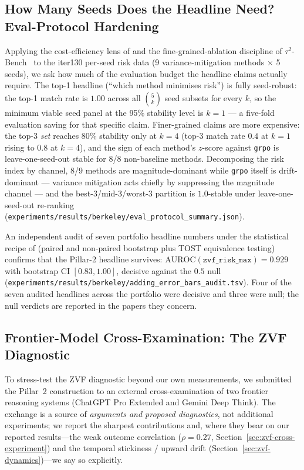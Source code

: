 \documentclass{article}
\begin{document}
 \subsection{How Many Seeds Does the Headline Need? Eval-Protocol Hardening}
\label{sec:zvf-eval-protocol}

Applying the cost-efficiency lens of \citet{yehudai2025survey} and the
fine-grained-ablation discipline of $\tau^2$-Bench~\citep{barres2025tau2}
to the iter130 per-seed risk data (9 variance-mitigation methods
$\times$ 5 seeds), we ask how much of the evaluation budget the headline
claims actually require. The top-1 headline (``which method minimises
risk'') is fully seed-robust: the top-1 match rate is $1.00$ across all
$\binom{5}{k}$ seed subsets for every $k$, so the minimum viable seed
panel at the 95\% stability level is $k{=}1$ --- a five-fold evaluation
saving for that specific claim. Finer-grained claims are more expensive:
the top-3 \emph{set} reaches 80\% stability only at $k{=}4$ (top-3 match
rate $0.4$ at $k{=}1$ rising to $0.8$ at $k{=}4$), and the sign of each
method's $z$-score against \texttt{grpo} is leave-one-seed-out stable
for 8/8 non-baseline methods. Decomposing the risk index by channel,
8/9 methods are magnitude-dominant while \texttt{grpo} itself is
drift-dominant --- variance mitigation acts chiefly by suppressing the
magnitude channel --- and the best-3/mid-3/worst-3 partition is
$1.0$-stable under leave-one-seed-out re-ranking
(\texttt{experiments/results/berkeley/eval\_protocol\_summary.json}).

An independent audit of seven portfolio headline numbers under the
statistical recipe of \citet{miller2024errorbars} (paired and non-paired
bootstrap plus TOST equivalence testing) confirms that the Pillar-2
headline survives: $\mathrm{AUROC}(\texttt{zvf\_risk\_max}) = 0.929$
with bootstrap CI $[0.83, 1.00]$, decisive against the $0.5$ null
(\texttt{experiments/results/berkeley/adding\_error\_bars\_audit.tsv}).
Four of the seven audited headlines across the portfolio were decisive
and three were null; the null verdicts are reported in the papers they
concern.
 

\subsection{Frontier-Model Cross-Examination: The ZVF Diagnostic}
\label{sec:frontier-zvf}

To stress-test the ZVF diagnostic beyond our own measurements, we
submitted the Pillar~2 construction to an external cross-examination of
two frontier reasoning systems (ChatGPT Pro Extended and Gemini Deep
Think). The exchange is a source of \emph{arguments and proposed
diagnostics}, not additional experiments; we report the sharpest
contributions and, where they bear on our reported results---the weak
outcome correlation ($\rho = 0.27$, Section~\ref{sec:zvf-cross-experiment})
and the temporal stickiness / upward drift
(Section~\ref{sec:zvf-dynamics})---we say so explicitly.
\end{document}

